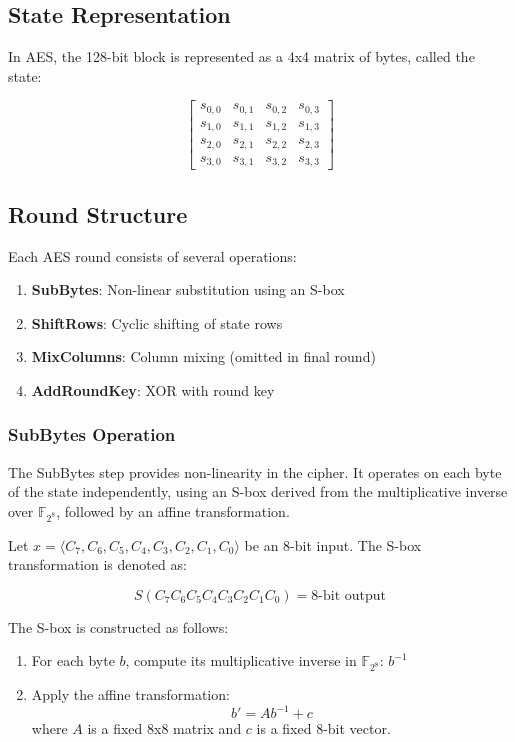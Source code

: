 \documentclass[11pt]{article}
\begin{document}
\subsection{State Representation}

In AES, the 128-bit block is represented as a 4x4 matrix of bytes, called the state:

\[
\begin{bmatrix}
s_{0,0} & s_{0,1} & s_{0,2} & s_{0,3} \\
s_{1,0} & s_{1,1} & s_{1,2} & s_{1,3} \\
s_{2,0} & s_{2,1} & s_{2,2} & s_{2,3} \\
s_{3,0} & s_{3,1} & s_{3,2} & s_{3,3}
\end{bmatrix}
\]

\subsection{Round Structure}

Each AES round consists of several operations:

\begin{enumerate}
    \item \textbf{SubBytes}: Non-linear substitution using an S-box
    \item \textbf{ShiftRows}: Cyclic shifting of state rows
    \item \textbf{MixColumns}: Column mixing (omitted in final round)
    \item \textbf{AddRoundKey}: XOR with round key
\end{enumerate}

\subsubsection{SubBytes Operation}

The SubBytes step provides non-linearity in the cipher. It operates on each byte of the state independently, using an S-box derived from the multiplicative inverse over $\mathbb{F}_{2^8}$, followed by an affine transformation.

Let $x = \langle C_7, C_6, C_5, C_4, C_3, C_2, C_1, C_0 \rangle$ be an 8-bit input. The S-box transformation is denoted as:

\[ S(C_7C_6C_5C_4C_3C_2C_1C_0) = \text{8-bit output} \]

The S-box is constructed as follows:

\begin{enumerate}
    \item For each byte $b$, compute its multiplicative inverse in $\mathbb{F}_{2^8}$: $b^{-1}$
    \item Apply the affine transformation:
    \[ b' = Ab^{-1} + c \]
    where $A$ is a fixed 8x8 matrix and $c$ is a fixed 8-bit vector.
\end{enumerate}
\end{document}
